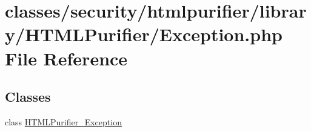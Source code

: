 \hypertarget{Exception_8php}{\section{classes/security/htmlpurifier/library/\+H\+T\+M\+L\+Purifier/\+Exception.php File Reference}
\label{Exception_8php}
}
\subsection*{Classes}
\begin{DoxyCompactItemize}
\item 
class \hyperlink{classHTMLPurifier__Exception}{H\+T\+M\+L\+Purifier\+\_\+\+Exception}
\end{DoxyCompactItemize}
